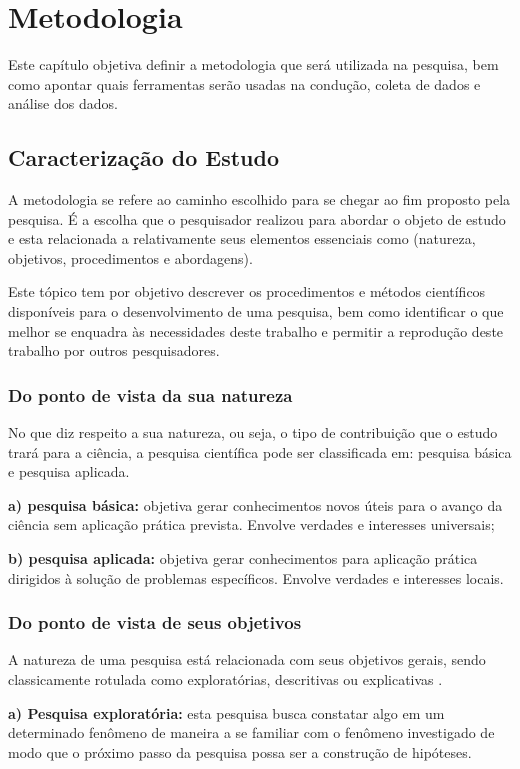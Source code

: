 \chapter{Metodologia}
Este capítulo objetiva definir a metodologia que será utilizada na pesquisa, bem como apontar quais ferramentas serão usadas na
condução, coleta de dados e análise dos dados.  
\section{Caracterização do Estudo}
A metodologia se refere ao caminho escolhido para se chegar ao fim proposto pela pesquisa. É a escolha que o pesquisador realizou para abordar o objeto de estudo e esta relacionada a relativamente seus elementos essenciais como (natureza, objetivos, procedimentos e abordagens)\cite{de2013metodologia}.

Este tópico tem por objetivo descrever os procedimentos e métodos científicos disponíveis para o desenvolvimento de uma pesquisa, bem como identificar o que melhor se enquadra às necessidades deste trabalho e permitir a reprodução deste trabalho por outros pesquisadores.

\subsection{Do ponto de vista da sua natureza}
No que diz respeito a sua natureza, ou seja, o tipo de contribuição que o estudo trará para a ciência, a pesquisa científica pode ser classificada em: pesquisa básica e pesquisa aplicada.

\textbf{a) pesquisa básica:} objetiva gerar conhecimentos novos úteis para o avanço da ciência sem aplicação prática prevista. Envolve verdades e interesses universais;

\textbf{b) pesquisa aplicada:} objetiva gerar conhecimentos para aplicação prática dirigidos à solução de problemas específicos. Envolve verdades e interesses locais.

\subsection{Do ponto de vista de seus objetivos}

A natureza de uma pesquisa está relacionada com seus objetivos gerais, sendo classicamente rotulada como exploratórias, descritivas ou explicativas \cite{gil2002elaborar}.

\textbf{a) Pesquisa exploratória:} esta pesquisa busca constatar algo em um determinado fenômeno de maneira a se familiar com o fenômeno investigado de modo que o próximo passo da pesquisa possa ser a construção de hipóteses.

